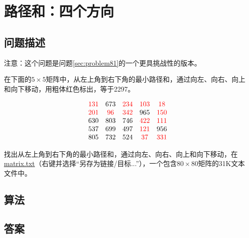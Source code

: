 \section{路径和：四个方向}\label{sec:problem83}
\subsection{问题描述}
\begin{tcolorbox}
	注意：这个问题是问题\ref{sec:problem81}的一个更具挑战性的版本。

	在下面的$5 \times 5$矩阵中，从左上角到右下角的最小路径和，通过向左、向右、向上和向下移动，用粗体红色标出，等于2297。

	\[
		\begin{array}{ccccc}
			\textcolor{red}{131} & 673      & \textcolor{red}{234} & \textcolor{red}{103} & \textcolor{red}{18}  \\
			\textcolor{red}{201} & \textcolor{red}{96} & \textcolor{red}{342} & 965       & \textcolor{red}{150} \\
			630       & 803      & 746       & \textcolor{red}{422} & \textcolor{red}{111} \\
			537       & 699      & 497       & \textcolor{red}{121} & 956       \\
			805       & 732      & 524       & \textcolor{red}{37}  & \textcolor{red}{331} \\
		\end{array}
	\]

	找出从左上角到右下角的最小路径和，通过向左、向右、向上和向下移动，在\href{https://projecteuler.net/resources/documents/0083_matrix.txt}{matrix.txt}（右键并选择“另存为链接/目标...”），一个包含$80 \times 80$矩阵的31K文本文件中。
\end{tcolorbox}

\subsection{算法}

\subsection{答案}
